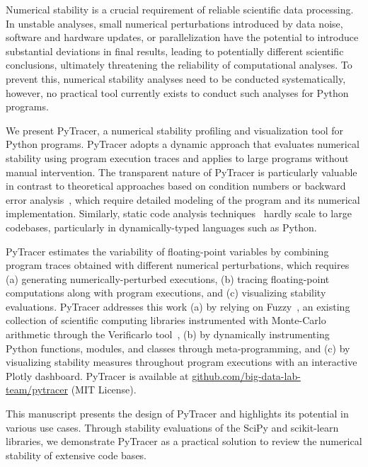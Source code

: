 \documentclass[10pt,journal,compsoc]{IEEEtran}
\newcommand{\pytracer}[0]{PyTracer\xspace}
\begin{document}
Numerical stability is a crucial requirement of reliable scientific data
processing. In unstable analyses, small numerical perturbations introduced by
data noise, software and hardware updates, or parallelization have the potential
to introduce substantial deviations in final results, leading to potentially
different scientific conclusions, ultimately threatening the reliability of
computational analyses. To prevent this, numerical stability analyses need to be
conducted systematically, however, no practical tool currently exists to conduct
such analyses for Python programs.

We present PyTracer, a numerical stability profiling and visualization tool for
Python programs. \pytracer adopts a dynamic approach that evaluates numerical
stability using program execution traces and applies to large programs without
manual intervention. The transparent nature of \pytracer is particularly
valuable in contrast to theoretical approaches based on condition numbers or
backward error analysis~\cite{higham2002accuracy}, which require detailed
modeling of the program and its numerical implementation. Similarly, static code
analysis techniques~\cite{goubault2006static} hardly scale to large codebases,
particularly in dynamically-typed languages such as Python.

\pytracer estimates the variability of floating-point variables by combining
program traces obtained with different numerical perturbations, which requires
(a) generating numerically-perturbed executions, (b) tracing floating-point
computations along with program executions, and (c) visualizing stability
evaluations. PyTracer addresses this work (a) by relying on
Fuzzy~\cite{kiar2020comparing}, an existing collection of scientific computing
libraries instrumented with Monte-Carlo arithmetic through the Verificarlo
tool~\cite{verificarlo}, (b) by dynamically instrumenting Python functions,
modules, and classes through meta-programming, and (c) by visualizing stability
measures throughout program executions with an interactive Plotly dashboard.
\mbox{\pytracer} is available at
\mbox{\href{https://github.com/big-data-lab-team/pytracer}{github.com/big-data-lab-team/pytracer}}
(MIT License).

This manuscript presents the design of \pytracer and highlights its potential in
various use cases. Through stability evaluations of the SciPy and scikit-learn
libraries, we demonstrate \pytracer as a practical solution to review the
numerical stability of extensive code bases.
\end{document}

